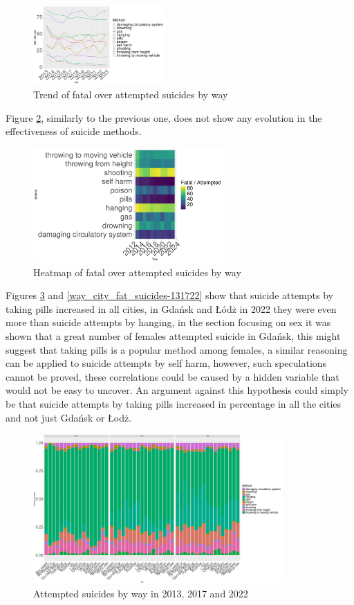 \documentclass{article}
\begin{document}
\begin{figure}[H]
    \centering
    \includegraphics[width=0.45\textwidth]{imgs/way_foa.pdf}
    \caption{Trend of fatal over attempted suicides by way }
    \label{way_foa}
\end{figure}
Figure \ref{way_foa_heat}, similarly to the previous one, does not show any
evolution in the effectiveness of suicide methods.
\begin{figure}[H]
    \centering
    \includegraphics[width=0.65\textwidth]{imgs/way_foa_heat.pdf}
    \caption{Heatmap of fatal over attempted suicides by way }
    \label{way_foa_heat}
\end{figure}
Figures \ref{way_city_att_suicides-131722} and \ref{way_city_fat_suicides-131722}  
show that suicide attempts by taking pills increased in all cities,
in Gdańsk and Łódż in 2022 they were even more than suicide attempts by hanging,
in the section focusing on sex it was shown that a great number of females 
attempted suicide in Gdańsk, this might suggest that taking pills is a popular
method among females, a similar reasoning can be applied to suicide attempts by self harm,
however, such speculations cannot be proved, these correlations could be caused 
by a hidden variable that would not be easy to uncover.
An argument against this hypothesis could simply be that suicide attempts by taking 
pills increased in percentage in all the cities and not just Gdańsk or Łodż.
\begin{figure}[H]
    \centering
    \includegraphics[width=0.85\textwidth]{imgs/way_city_att_suicides-131722.pdf}
    \caption{Attempted suicides by way  in 2013, 2017 and 2022}
    \label{way_city_att_suicides-131722}
\end{figure}
\end{document}
